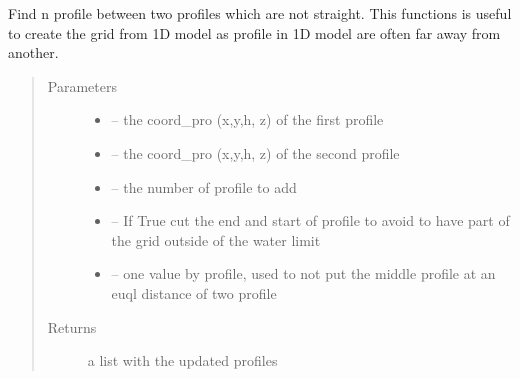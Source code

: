\documentclass[letterpaper,10pt,english]{sphinxmanual}
\begin{document}
\begin{fulllineitems}
\label{\detokenize{index:src.manage_grid_8.find_profile_between}}
Find n profile between two profiles which are not straight. This functions is useful to create the grid from 1D model
as profile in 1D model are often far away from another.
\begin{quote}\begin{description}
\item[{Parameters}] \leavevmode\begin{itemize}
\item {} 
 -- the coord\_pro (x,y,h, z) of the first profile

\item {} 
 -- the coord\_pro (x,y,h, z) of the second profile

\item {} 
 -- the number of profile to add

\item {} 
 -- If True cut the end and start of profile to avoid to have part of the grid outside of the water limit

\item {} 
 -- one value by profile, used to not put the middle profile at an euql distance of two profile

\end{itemize}

\item[{Returns}] \leavevmode
a list with the updated profiles

\end{description}\end{quote}

\end{fulllineitems}

\end{document}

